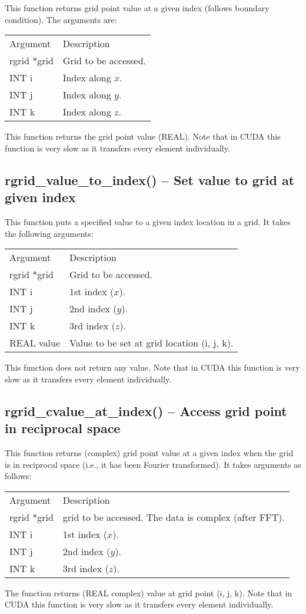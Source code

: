 \documentclass[12pt,letterpaper]{report}
\begin{document}
This function returns grid point value at a given index (follows boundary condition). The arguments are:
\begin{longtable}{p{} p{}}
Argument & Description\\
\cline{1-2}
rgrid *grid & Grid to be accessed.\\
INT i & Index along $x$.\\
INT j & Index along $y$.\\
INT k & Index along $z$.\\
\end{longtable}
\noindent
This function returns the grid point value (REAL). Note that in CUDA this function is very slow as it transfers every element individually.

\subsection{rgrid\_value\_to\_index() -- Set value to grid at given index}

This function puts a specified value to a given index location in a grid. It takes the following arguments:
\begin{longtable}{p{} p{}}
Argument & Description\\
\cline{1-2}
rgrid *grid & Grid to be accessed.\\
INT i & 1st index ($x$).\\
INT j & 2nd index ($y$).\\
INT k & 3rd index ($z$).\\
REAL value & Value to be set at grid location (i, j, k).\\
\end{longtable}
\noindent
This function does not return any value. Note that in CUDA this function is very slow as it transfers every element individually.

\subsection{rgrid\_cvalue\_at\_index() -- Access grid point in reciprocal space}

This function returns (complex) grid point value at a given index when the grid is in reciprocal space (i.e., it has been Fourier transformed). It takes arguments as follows:
\begin{longtable}{p{} p{}}
Argument & Description\\
\cline{1-2}
rgrid *grid & grid to be accessed. The data is complex (after FFT).\\
INT i & 1st index ($x$).\\
INT j & 2nd index ($y$).\\
INT k & 3rd index ($z$).\\
\end{longtable}
\noindent
The function returns (REAL complex) value at grid point (i, j, k). Note that in CUDA this function is very slow as it transfers every element individually.
\end{document}
